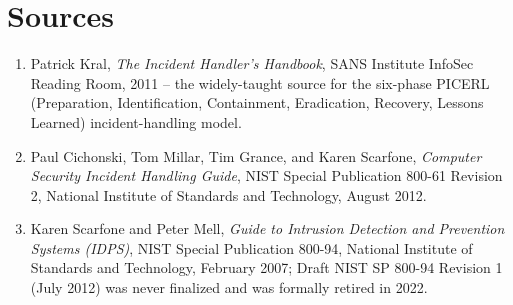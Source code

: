 \section*{Sources}
\begin{enumerate}[label=\lbrack\arabic*\rbrack, leftmargin=2.2em]
\item {}Patrick Kral, \emph{The Incident Handler's Handbook}, SANS Institute
InfoSec Reading Room, 2011 -- the widely-taught source for the six-phase PICERL (Preparation,
Identification, Containment, Eradication, Recovery, Lessons Learned) incident-handling model.
\item {}Paul Cichonski, Tom Millar, Tim Grance, and Karen Scarfone, \emph{Computer
Security Incident Handling Guide}, NIST Special Publication 800-61 Revision 2, National Institute
of Standards and Technology, August 2012.
\item {}Karen Scarfone and Peter Mell, \emph{Guide to Intrusion Detection and
Prevention Systems (IDPS)}, NIST Special Publication 800-94, National Institute of Standards and
Technology, February 2007; Draft NIST SP 800-94 Revision 1 (July 2012) was never finalized and was
formally retired in 2022.
\end{enumerate}
